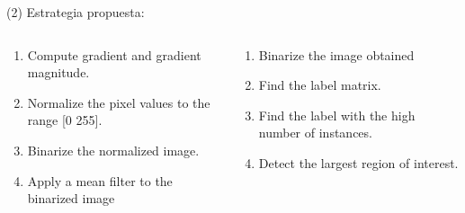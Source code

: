 \begin{frame}{ (2)}
Estrategia propuesta:
\begin{columns}
		\begin{column}{0.48\textwidth}

		    \begin{enumerate} \small
		        \item Compute gradient and gradient magnitude.
                \item Normalize the pixel values to the range [0 255].
                \item Binarize the normalized image.
                \item Apply a mean filter to the binarized image            
            \end{enumerate}  
        \end{column}          
		\begin{column}{0.48\textwidth}
		    \begin{enumerate} \small
				\setcounter{enumi}{4}
    \item Binarize the image obtained
                \item Find the label matrix.
                \item Find the label with the high number of instances.
                \item Detect the largest region of interest.			
            \end{enumerate}  

        \end{column}
\end{columns}







\end{frame}
